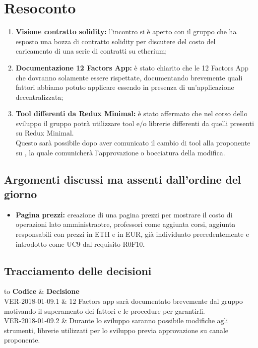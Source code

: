 \documentclass[VER-2018-01-09.tex]{subfiles}
\begin{document}
\chapter{Resoconto}
\begin{enumerate}
	\item \textbf{Visione contratto solidity:} l'incontro si è aperto con il gruppo \gruppo che ha esposto una bozza di contratto solidity per discutere del costo del caricamento di una serie di contratti su  etherium;
	
	\item \textbf{Documentazione 12 Factors App:} è stato chiarito che le 12 Factors App che dovranno solamente essere rispettate, documentando brevemente quali fattori abbiamo potuto applicare essendo in presenza di un'applicazione decentralizzata;
	
	\item \textbf{Tool differenti da Redux Minimal:} è stato affermato che nel corso dello sviluppo il gruppo potrà utilizzare tool e/o librerie differenti da quelli presenti su Redux Minimal.\\
	Questo sarà possibile dopo aver comunicato il cambio di tool alla proponente su , la quale comunicherà l'approvazione o bocciatura della modifica.
\end{enumerate}
\section{Argomenti discussi ma assenti dall'ordine del giorno}
\begin{itemize}
	\item \textbf{Pagina prezzi:} creazione di una pagina prezzi per mostrare il costo di operazioni lato amministraotre, professori come aggiunta corsi, aggiunta responsabili con prezzi in ETH e in EUR, già individuato precedentemente e introdotto come UC9 dal requisito R0F10.
\end{itemize}
\section{Tracciamento delle decisioni}
\begin{table}[H]
	\begin{center}
		\begin{tabu} to 
			\tableHeaderStyle
			\textbf{Codice} & \textbf{Decisione} \\
			VER-2018-01-09.1 & 12 Factors app sarà documentato brevemente dal gruppo motivando il superamento dei fattori e le procedure per garantirli. \\
			VER-2018-01-09.2 & Durante lo sviluppo saranno possibile modifiche agli strumenti, librerie utilizzati per lo sviluppo previa approvazione su canale  proponente. \\
		\end{tabu}
	\caption{Tracciamento delle decisioni del verbale}
	\end{center}
\end{table}
\end{document}
